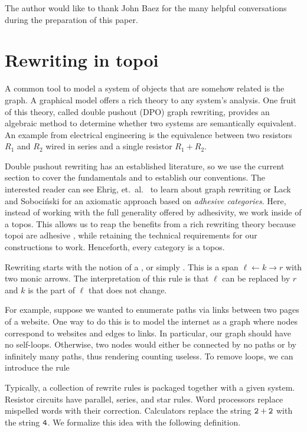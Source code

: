 \documentclass{amsart}
\begin{document}
The author would like to thank John Baez for the many
helpful conversations during the preparation of this paper.


\section{Rewriting in topoi}
\label{sec:RewriteTopoi}

A common tool to model a system of objects that
are somehow related is the graph. A
graphical model offers a rich theory to any
system's analysis. One fruit of this theory,
called double pushout (DPO) graph rewriting,
provides an algebraic method to determine whether
two systems are semantically equivalent. An
example from electrical engineering is the
equivalence between two resistors $ R_1 $ and $ R_2 $ wired in series
and a single resistor $ R_1 + R_2 $.

Double pushout rewriting has an established
literature, so we use the current section to cover
the fundamentals and to establish our conventions.
The interested reader can see Ehrig, et.\ al.\
\cite{Ehrig_GraphGram} to learn about graph
rewriting or Lack and Soboci\'{n}ski
\cite{LackSobo_Adhesive} for an axiomatic approach
based on \emph{adhesive categories}. Here, instead
of working with the full generality offered by
adhesivity, we work inside of a
topos. This allows us to reap the benefits from a
rich rewriting theory because topoi are
adhesive \cite{LackSobo_TopsIsAdh}, while
retaining the technical requirements for our
constructions to work. Henceforth, every category
is a topos.

Rewriting starts with the notion of a , or
simply . This is a span $\ell \gets k \to r$
with two monic arrows. The interpretation of this rule is that
$ \ell $ can be replaced by $ r $ and $ k $ is the part of
$ \ell $ that does not change.

For example, suppose we wanted to enumerate paths
via links between two pages of a website. One way
to do this is to model the internet as a graph
where nodes correspond to websites and edges to
links.  In particular, our graph should have no
self-loops. Otherwise, two nodes would either be
connected by no paths or by infinitely many paths,
thus rendering counting useless.  To remove loops,
we can introduce the rule


Typically, a collection of rewrite rules is packaged
together with a given system. Resistor circuits have
parallel, series, and star rules. Word processors replace
mispelled words with their correction. Calculators replace
the string $\mathtt{2+2}$ with the string $ \mathtt{4} $. We
formalize this idea with the following definition.
\end{document}
